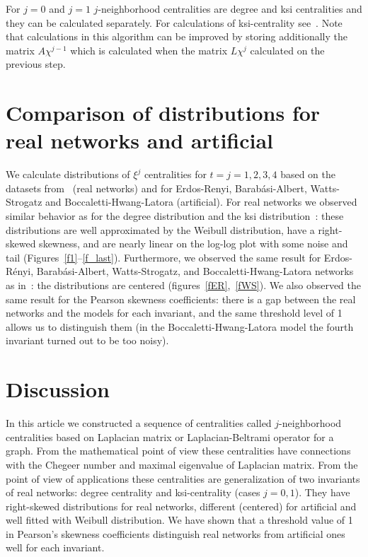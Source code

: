 \documentclass[12pt, a4paper]{extarticle}
\begin{document}
For $j = 0$ and $j = 1$ $j$-neighborhood centralities are degree and ksi centralities and they can be calculated separately. For calculations of ksi-centrality see~\cite{Tuz}. Note that calculations in this algorithm can be improved by storing additionally the matrix $A\chi^{j-1}$ which is calculated when the matrix $L\chi^j$ calculated on the previous step.


\section{Comparison of distributions for real networks and artificial}

We calculate distributions of $\xi^j$ centralities for $t=j=1,2,3,4$ based on the datasets from~\cite{Tuz} (real networks) and for Erdos-Renyi, Barabási-Albert, Watts-Strogatz and Boccaletti-Hwang-Latora (artificial). For real networks we observed similar behavior as for the degree distribution and the ksi distribution~\cite{Tuz}: these distributions are well approximated by the Weibull distribution, have a right-skewed skewness, and are nearly linear on the log-log plot with some noise and tail (Figures~\ref{f1}--\ref{f_last}). Furthermore, we observed the same result for Erdos-Rényi, Barabási-Albert, Watts-Strogatz, and Boccaletti-Hwang-Latora networks as in~\cite{Tuz}: the distributions are centered (figures~\ref{fER},~\ref{fWS}). We also observed the same result for the Pearson skewness coefficients: there is a gap between the real networks and the models for each invariant, and the same threshold level of 1 allows us to distinguish them (in the Boccaletti-Hwang-Latora model the fourth invariant turned out to be too noisy).

\section{Discussion}

In this article we constructed a sequence of centralities called $j$-neighborhood centralities based on Laplacian matrix or Laplacian-Beltrami operator for a graph. From the mathematical point of view these centralities have connections with  the Chegeer number and maximal eigenvalue of Laplacian matrix. From the point of view of applications these centralities are generalization of two invariants of real networks: degree centrality and ksi-centrality (cases $j=0, 1$). They have right-skewed distributions for real networks, different (centered) for artificial and well fitted with Weibull distribution. We have shown that a threshold value of 1 in Pearson's skewness coefficients distinguish real networks from artificial ones well for each invariant.
\end{document}
